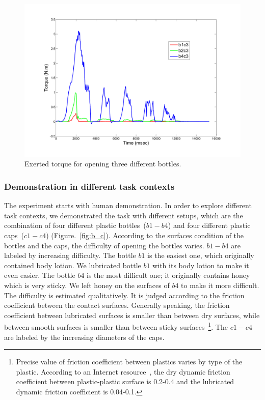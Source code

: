 \begin{figure}[ht!]
  \centering
  \includegraphics[width=12cm]{./fig_cha4/b1b3b4_time_T_2.pdf}
  \caption{  {Exerted torque for opening three different bottles.}
}
\label{fig:bottlepatterns}
\end{figure}


\subsubsection{Demonstration in different task contexts}
\label{cha4:sec3:experimentsetup:taskcontexts}
The experiment starts with human demonstration. In order to explore
different task contexts, we demonstrated the task with different
setups, which are the combination of four different plastic
bottles~($b1-b4$) and four different plastic caps~($c1-c4$)
(Figure.~\ref{fig:b_c}). According to the surfaces condition of the
bottles and the caps, the difficulty of opening the bottles
varies. $b1-b4$ are labeled by increasing difficulty. The bottle $b1$
is the easiest one, which originally contained body lotion. We
lubricated bottle $b1$ with its body lotion to make it even easier. The
bottle $b4$ is the most difficult one; it originally contains honey
which is very sticky. We left honey on the surfaces of $b4$ to make
it more difficult. The difficulty is estimated qualitatively. It is
judged according to the friction coefficient between the contact
surfaces. Generally speaking, the friction coefficient between
lubricated surfaces is smaller than between dry surfaces, while
between smooth surfaces is smaller than between sticky
surfaces~\footnote{Precise value of friction coefficient between
plastics varies by type of the plastic. According to an Internet
resource~\citep{FOC}, the dry dynamic friction coefficient between
plastic-plastic surface is 0.2-0.4 and the lubricated dynamic
friction coefficient is 0.04-0.1.}.
The $c1-c4$ are labeled by the increasing diameters of the caps.

